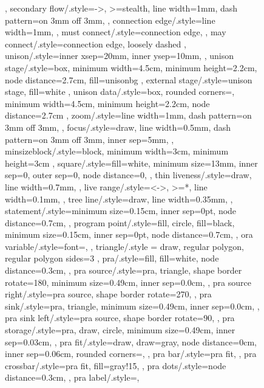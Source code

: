\documentclass[acmsmall,authorversion,nonacm]{acmart}
\begin{document}
\begin{figure}
{{{{{  },
  secondary flow/.style={->,
    >=stealth,
    line width=1mm,
    dash pattern=on 3mm off 3mm,
  },
  connection edge/.style={line width=1mm,
  },
  must connect/.style={connection edge,
  },
  may connect/.style={connection edge,
    loosely dashed
  },
  unison/.style={inner xsep=20mm,
    inner ysep=10mm,
  },
  unison stage/.style={box,
    minimum width=4.5cm,
    minimum height=2.2cm,
    node distance=2.7cm,
    fill=unisonbg
  },
  external stage/.style={unison stage,
    fill=white
  },
  unison data/.style={box,
    rounded corners=\cornerRadius,
    minimum width=4.5cm,
    minimum height=2.2cm,
    node distance=2.7cm
  },
  zoom/.style={line width=1mm,
    dash pattern=on 3mm off 3mm,
  },
  focus/.style={draw,
    line width=0.5mm,
    dash pattern=on 3mm off 3mm,
    inner sep=5mm,
  },
  minsizeblock/.style={block,
    minimum width=3cm,
    minimum height=3cm
  },
  square/.style={fill=white,
    minimum size=13mm,
    inner sep=0,
    outer sep=0,
    node distance=0,
  },
  thin liveness/.style={draw,
    line width=0.7mm,
  },
  live range/.style={<->,
      >=*,
      line width=0.1mm,
    },
  tree line/.style={draw,
    line width=0.35mm,
  },
  statement/.style={minimum size=0.15cm,
    inner sep=0pt,
    node distance=0.7cm,
  },
  program point/.style={fill,
    circle,
    fill=black,
    minimum size=0.15cm,
    inner sep=0pt,
    node distance=0.7cm,
  },
  ora variable/.style={font=\small,
  },
  triangle/.style = {draw, regular polygon, regular polygon sides=3 },
  pra/.style={fill,
    fill=white,
    node distance=0.3cm,
  },
  pra source/.style={pra,
    triangle,
    shape border rotate=180,
    minimum size=0.49cm,
    inner sep=0.0cm,
  },
  pra source right/.style={pra source,
    shape border rotate=270,
  },
  pra sink/.style={pra,
    triangle,
    minimum size=0.49cm,
    inner sep=0.0cm,
  },
  pra sink left/.style={pra source,
    shape border rotate=90,
  },
  pra storage/.style={pra,
    draw,
    circle,
    minimum size=0.49cm,
    inner sep=0.03cm,
  },
  pra fit/.style={draw,
    draw=gray,
    node distance=0cm,
    inner sep=0.06cm,
    rounded corners=\cornerRadius,
  },
  pra bar/.style={pra fit,
  },
  pra crossbar/.style={pra fit,
    fill=gray!15,
  },
  pra dots/.style={node distance=0.3cm,
  },
  pra label/.style={},
} }}}
\end{figure}
\end{document}
